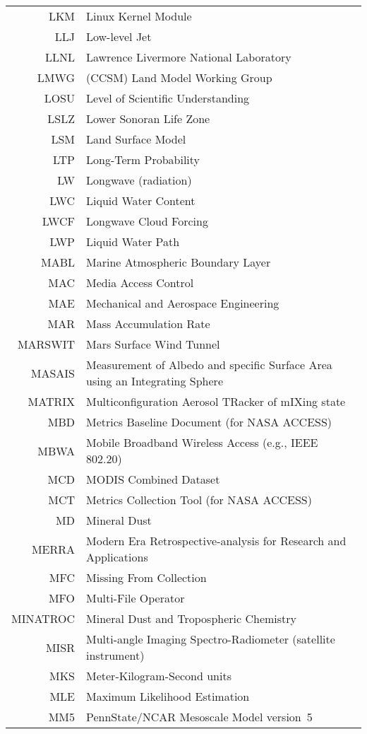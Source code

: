\documentclass[12pt,twoside]{article}
\begin{document}
\begin{longtable}[>{\bfseries}l]{>{\ttfamily}r l}
LKM & Linux Kernel Module \\
LLJ & Low-level Jet \\
LLNL & Lawrence Livermore National Laboratory \\
LMWG & (CCSM) Land Model Working Group \\
LOSU & Level of Scientific Understanding \\
LSLZ & Lower Sonoran Life Zone \\
LSM & Land Surface Model \\
LTP & Long-Term Probability \\
LW & Longwave (radiation) \\
LWC & Liquid Water Content \\
LWCF & Longwave Cloud Forcing \\
LWP & Liquid Water Path \\
MABL & Marine Atmospheric Boundary Layer \\
MAC & Media Access Control \\
MAE & Mechanical and Aerospace Engineering \\
MAR & Mass Accumulation Rate \\
MARSWIT & Mars Surface Wind Tunnel \\
MASAIS & Measurement of Albedo and specific Surface Area using an Integrating Sphere \\
MATRIX & Multiconfiguration Aerosol TRacker of mIXing state \\
MBD & Metrics Baseline Document (for NASA ACCESS) \\
MBWA & Mobile Broadband Wireless Access (e.g., IEEE 802.20) \\
MCD & MODIS Combined Dataset \\
MCT & Metrics Collection Tool (for NASA ACCESS) \\
MD & Mineral Dust \\
MERRA & Modern Era Retrospective-analysis for Research and Applications \\
MFC & Missing From Collection \\
MFO & Multi-File Operator \\
MINATROC & Mineral Dust and Tropospheric Chemistry \\
MISR &  Multi-angle Imaging Spectro-Radiometer (satellite instrument) \\
MKS & Meter-Kilogram-Second units \\
MLE & Maximum Likelihood Estimation \\
MM5 & PennState/NCAR Mesoscale Model version~5 \\

\end{longtable}
\end{document}
